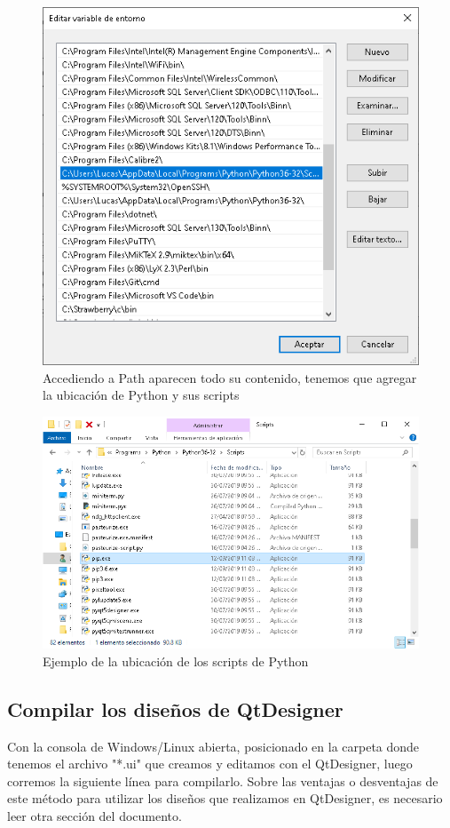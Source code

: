 \begin{figure}[H]
    \centering
    \includegraphics[scale=0.3]{imagenes/cmd/cmd_5.PNG}
    \caption{Accediendo a Path aparecen todo su contenido, tenemos que agregar la ubicaci\'on de Python y sus scripts}
\end{figure}

\begin{figure}[H]
    \centering
    \includegraphics[scale=0.3]{imagenes/cmd/cmd_6.PNG}
    \caption{Ejemplo de la ubicaci\'on de los scripts de Python}
\end{figure}

\subsection{Compilar los dise\~nos de QtDesigner}
Con la consola de Windows/Linux abierta, posicionado en la carpeta donde tenemos el archivo "*.ui" que creamos y editamos con el QtDesigner,
luego corremos la siguiente l\'inea para compilarlo. Sobre las ventajas o desventajas de este m\'etodo para utilizar los dise\~nos que realizamos en QtDesigner,
es necesario leer otra secci\'on del documento.

